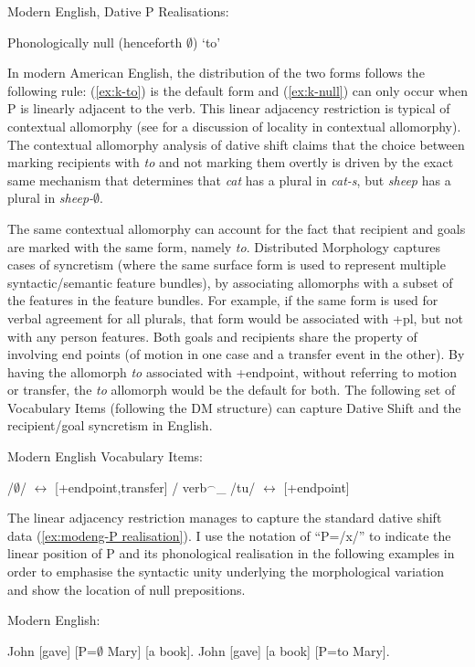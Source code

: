 	\begin{exe}
		\ex Modern English, Dative P Realisations:
		\begin{xlist}
			\ex Phonologically null\label{ex:k-null} (henceforth $\emptyset$)
			\ex `to'\label{ex:k-to}
		\end{xlist}
	\end{exe}

	In modern American English, the distribution of the two forms follows the following rule: (\ref{ex:k-to}) is the default form and (\ref{ex:k-null}) can only occur when P is linearly adjacent to the verb. This linear adjacency restriction is typical of contextual allomorphy (see \citet{Embick.2010} for a discussion of locality in contextual allomorphy). The contextual allomorphy analysis of dative shift claims that the choice between marking recipients with \textit{to} and not marking them overtly is driven by the exact same mechanism that determines that \textit{cat} has a plural in \textit{cat-s}, but \textit{sheep} has a plural in \textit{sheep-$\emptyset$}.

	The same contextual allomorphy can account for the fact that recipient and goals are marked with the same form, namely \textit{to}. Distributed Morphology \citep{Halle.1993} captures cases of syncretism (where the same surface form is used to represent multiple syntactic/semantic feature bundles), by associating allomorphs with a subset of the features in the feature bundles. For example, if the same form is used for verbal agreement for all plurals, that form would be associated with +pl, but not with any person features. Both goals and recipients share the property of involving end points (of motion in one case and a transfer event in the other). By having the allomorph \textit{to} associated with +endpoint, without referring to motion or transfer, the \textit{to} allomorph would be the default for both. The following set of Vocabulary Items (following the DM structure) can capture Dative Shift and the recipient/goal syncretism in English.

	\begin{exe}
		\ex Modern English Vocabulary Items:\label{ex:mevi}
		\begin{xlist}
			\ex /$\emptyset$/ $\leftrightarrow$ [+endpoint,transfer] / verb$^{\smallfrown}$\_
			\ex /tu/ $\leftrightarrow$ [+endpoint]
		\end{xlist}
	\end{exe}

	The linear adjacency restriction manages to capture the standard dative shift data (\ref{ex:modeng-P realisation}). I use the notation of ``P=/x/'' to indicate the linear position of P and its phonological realisation in the following examples in order to emphasise the syntactic unity underlying the morphological variation and show the location of null prepositions.
	\begin{exe}
		\ex Modern English:\label{ex:modeng-P realisation}
		\begin{xlist}
	\ex John [gave] [P=$\emptyset$ Mary] [a book].
	\ex John [gave] [a book] [P=to Mary].
\end{xlist}
	\end{exe}

